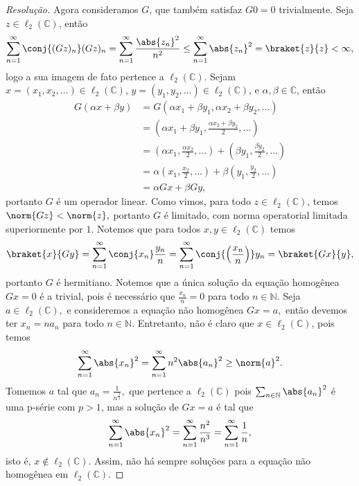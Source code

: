 \begin{proof}[Resolução]
    Agora consideramos \(G\), que também satisfaz \(G0 = 0\) trivialmente. Seja \(z \in \ell_2(\mathbb{C})\), então
    \begin{equation*}
       \sum_{n = 1}^{\infty} \conj{(Gz)_n} (Gz)_n = \sum_{n = 1}^{\infty} \frac{\abs{z_{n}}^2}{n^2} \leq \sum_{n = 1}^\infty \abs{z_n}^2 = \braket{z}{z} < \infty,
    \end{equation*}
    logo a sua imagem de fato pertence a \(\ell_2(\mathbb{C})\). Sejam \(x = (x_1, x_2, \dots) \in \ell_2(\mathbb{C})\), \(y = (y_1, y_2, \dots) \in \ell_2(\mathbb{C})\), e \(\alpha, \beta \in \mathbb{C}\), então
    \begin{align*}
       G(\alpha x + \beta y) &= G \left(\alpha x_1 + \beta y_1, \alpha x_2 + \beta y_2, \dots\right)\\
                             &= \left(\alpha x_1 + \beta y_1, \frac{\alpha x_2 + \beta y_2}{2}, \dots\right)\\
                             &= (\alpha x_1, \frac{\alpha x_2}{2}, \dots) + (\beta y_1, \frac{\beta y_2}{2}, \dots)\\
                             &= \alpha (x_1, \frac{x_2}{2}, \dots) + \beta (y_1, \frac{y_2}{2}, \dots)\\
                             &= \alpha Gx + \beta Gy,
    \end{align*}
    portanto \(G\) é um operador linear. Como vimos, para todo \(z \in \ell_2(\mathbb{C})\), temos \(\norm{Gz} < \norm{z},\) portanto \(G\) é limitado, com norma operatorial limitada superiormente por \(1\). Notemos que para todos \(x,y \in \ell_2(\mathbb{C})\) temos
    \begin{equation*}
       \braket{x}{Gy} = \sum_{n = 1}^\infty \conj{x_n}\frac{y_n}{n} = \sum_{n=1}^\infty \conj{\left(\frac{x_n}{n}\right)}y_n = \braket{Gx}{y},
    \end{equation*}
    portanto \(G\) é hermitiano. Notemos que a única solução da equação homogênea \(Gx = 0\) é a trivial, pois é necessário que \(\frac{x_n}{n} = 0\) para todo \(n \in \mathbb{N}\). Seja \(a \in \ell_2(\mathbb{C}),\) e consideremos a equação não homogênea \(Gx = a,\) então devemos ter \(x_n = n a_{n}\) para todo \(n \in \mathbb{N}\). Entretanto, não é claro que \(x \in \ell_2(\mathbb{C})\), pois temos
    \begin{equation*}
       \sum_{n = 1}^\infty \abs{x_n}^2 = \sum_{n = 1}^\infty n^2 \abs{a_n}^2 \geq \norm{a}^2.
    \end{equation*}
    Tomemos \(a\) tal que \(a_n = \frac{1}{n^{\frac32}},\) que pertence a \(\ell_2(\mathbb{C})\) pois \(\sum_{n \in \mathbb{N}} \abs{a_n}^2\) é uma p-série com \(p > 1\), mas a solução de \(Gx = a\) é tal que
    \begin{equation*}
       \sum_{n = 1}^\infty \abs{x_n}^2 = \sum_{n = 1}^\infty \frac{n^2}{n^3} = \sum_{n = 1}^\infty \frac1n,
    \end{equation*}
    isto é, \(x \notin \ell_2(\mathbb{C})\). Assim, não há sempre soluções para a equação não homogênea em \(\ell_2(\mathbb{C}).\)
\end{proof}
